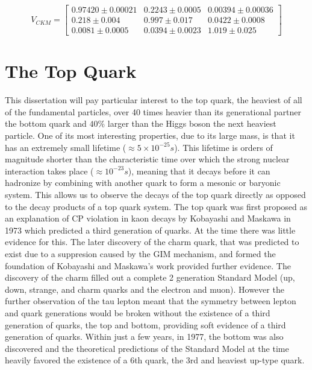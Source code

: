 \[ V_{CKM} =
\begin{bmatrix}
0.97420 \pm 0.00021 & 0.2243 \pm 0.0005 & 0.00394 \pm 0.00036 \\ 
0.218 \pm 0.004 & 0.997 \pm 0.017 & 0.0422 \pm 0.0008 \\
0.0081 \pm 0.0005 & 0.0394 \pm 0.0023 & 1.019 \pm 0.025 
\end{bmatrix}
\]


\section{The Top Quark}

This dissertation will pay particular interest to the top quark, the heaviest of all of the fundamental particles, over 40 times heavier than its generational partner the bottom quark and $40\%$ larger than the Higgs boson the next heaviest particle.  One of its most interesting properties, due to its large mass, is that it has an extremely small lifetime ($\approx 5 \times 10^{-25} s$).  This lifetime is orders of magnitude shorter than the characteristic time over which the strong nuclear interaction takes place ($\approx 10^{-23}s$), meaning that it decays before it can hadronize by combining with another quark to form a mesonic or baryonic system.  This allows us to observe the decays of the top quark directly as opposed to the decay products of a top quark system.
The top quark was first proposed as an explanation of CP violation in kaon decays by Kobayashi and Maskawa in 1973\cite{CKM2} which predicted a third generation of quarks.  At the time there was little evidence for this.  The later discovery of the charm quark, that was predicted to exist due to a suppresion caused by the GIM mechanism\cite{GIM}, and formed the foundation of Kobayashi and Maskawa's work provided further evidence.  The discovery of the charm filled out a complete 2 generation Standard Model (up, down, strange, and charm quarks and the electron and muon).  However the further observation of the tau lepton meant that the symmetry between lepton and quark generations would be broken without the existence of a third generation of quarks, the top and bottom, providing soft evidence of a third generation of quarks.  Within just a few years, in 1977, the bottom was also discovered\cite{BDiscovery} and the theoretical predictions of the Standard Model at the time heavily favored the existence of a 6th quark, the 3rd and heaviest up-type quark.  

